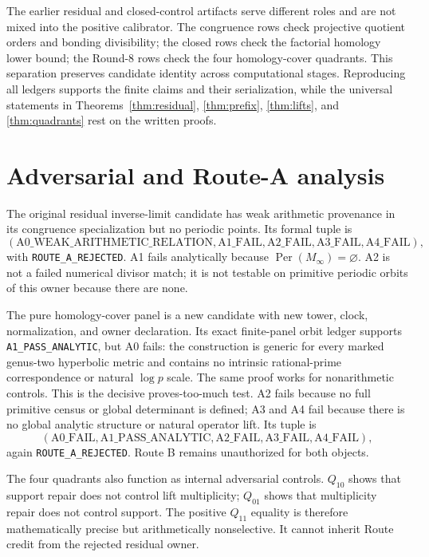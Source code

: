 \documentclass[11pt]{article}
\theoremstyle{definition}
\theoremstyle{remark}
\newcommand{\Per}{\operatorname{Per}}
\begin{document}
The earlier residual and closed-control artifacts serve different roles and are not mixed into the positive calibrator. The congruence rows check projective quotient orders and bonding divisibility; the closed rows check the factorial homology lower bound; the Round-8 rows check the four homology-cover quadrants. This separation preserves candidate identity across computational stages. Reproducing all ledgers supports the finite claims and their serialization, while the universal statements in Theorems~\ref{thm:residual}, \ref{thm:prefix}, \ref{thm:lifts}, and \ref{thm:quadrants} rest on the written proofs.

\section{Adversarial and Route-A analysis}

The original residual inverse-limit candidate has weak arithmetic provenance in its congruence specialization but no periodic points. Its formal tuple is
\[
(\mathrm{A0\_WEAK\_ARITHMETIC\_RELATION},
\mathrm{A1\_FAIL},\mathrm{A2\_FAIL},\mathrm{A3\_FAIL},\mathrm{A4\_FAIL}),
\]
with \texttt{ROUTE\_A\_REJECTED}. A1 fails analytically because $\Per(M_\infty)=\varnothing$. A2 is not a failed numerical divisor match; it is not testable on primitive periodic orbits of this owner because there are none.

The pure homology-cover panel is a new candidate with new tower, clock, normalization, and owner declaration. Its exact finite-panel orbit ledger supports \texttt{A1\_PASS\_ANALYTIC}, but A0 fails: the construction is generic for every marked genus-two hyperbolic metric and contains no intrinsic rational-prime correspondence or natural $\log p$ scale. The same proof works for nonarithmetic controls. This is the decisive proves-too-much test. A2 fails because no full primitive census or global determinant is defined; A3 and A4 fail because there is no global analytic structure or natural operator lift. Its tuple is
\[
(\mathrm{A0\_FAIL},\mathrm{A1\_PASS\_ANALYTIC},
\mathrm{A2\_FAIL},\mathrm{A3\_FAIL},\mathrm{A4\_FAIL}),
\]
again \texttt{ROUTE\_A\_REJECTED}. Route B remains unauthorized for both objects.

The four quadrants also function as internal adversarial controls. $Q_{10}$ shows that support repair does not control lift multiplicity; $Q_{01}$ shows that multiplicity repair does not control support. The positive $Q_{11}$ equality is therefore mathematically precise but arithmetically nonselective. It cannot inherit Route credit from the rejected residual owner.
\end{document}
